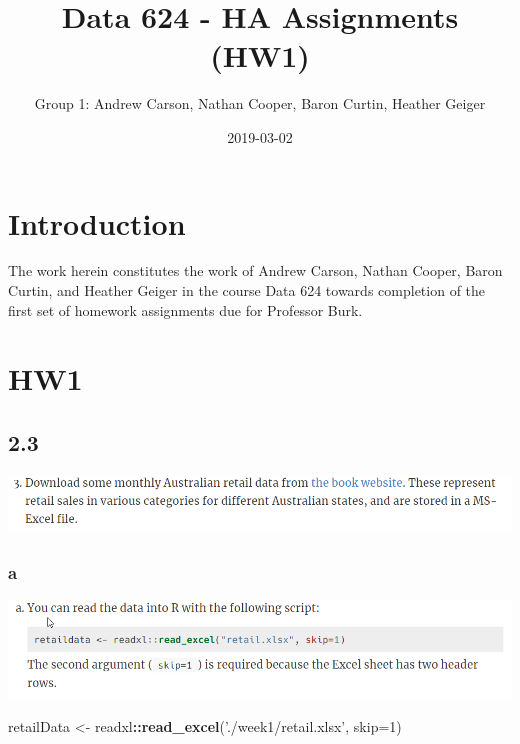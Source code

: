 \documentclass[]{book}
\title{Data 624 - HA Assignments (HW1)}
\author{Group 1: Andrew Carson, Nathan Cooper, Baron Curtin, Heather Geiger}
\date{2019-03-02}
\newenvironment{Shaded}{\begin{snugshade}}{\end{snugshade}}
\newcommand{\DataTypeTok}[1]{\textcolor[rgb]{0.13,0.29,0.53}{#1}}
\newcommand{\DecValTok}[1]{\textcolor[rgb]{0.00,0.00,0.81}{#1}}
\newcommand{\KeywordTok}[1]{\textcolor[rgb]{0.13,0.29,0.53}{\textbf{#1}}}
\newcommand{\NormalTok}[1]{#1}
\newcommand{\OperatorTok}[1]{\textcolor[rgb]{0.81,0.36,0.00}{\textbf{#1}}}
\newcommand{\StringTok}[1]{\textcolor[rgb]{0.31,0.60,0.02}{#1}}
\begin{document}
\maketitle

{
\setcounter{tocdepth}{1}
\tableofcontents
}
\hypertarget{introduction}{%
\chapter{Introduction}\label{introduction}}

The work herein constitutes the work of Andrew Carson, Nathan Cooper, Baron Curtin, and Heather Geiger in the course Data 624 towards completion of the first set of homework assignments due for Professor Burk.

\hypertarget{hw1}{%
\chapter{HW1}\label{hw1}}

\hypertarget{section}{%
\section{2.3}\label{section}}

\includegraphics{./week1/2.3.png}

\hypertarget{a}{%
\subsection{a}\label{a}}

\includegraphics{./week1/2.3a.png}

\begin{Shaded}
\begin{Highlighting}[]
\NormalTok{retailData <-}\StringTok{  }\NormalTok{readxl}\OperatorTok{::}\KeywordTok{read_excel}\NormalTok{(}\StringTok{'./week1/retail.xlsx'}\NormalTok{, }\DataTypeTok{skip=}\DecValTok{1}\NormalTok{)}
\end{Highlighting}
\end{Shaded}
\end{document}
